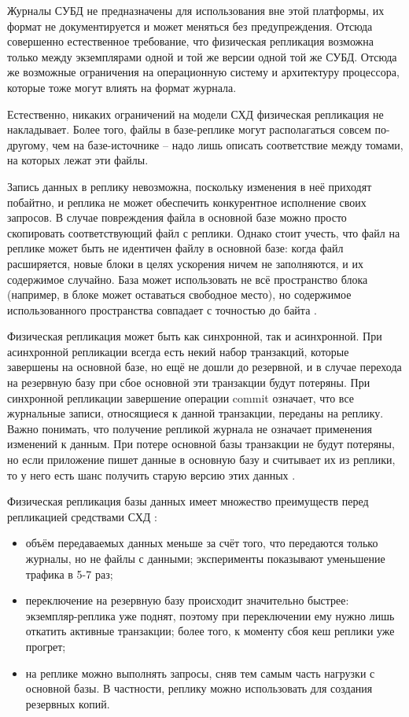 Журналы СУБД не предназначены для использования вне этой платформы, их формат не документируется и может меняться без
предупреждения. Отсюда совершенно естественное требование, что физическая репликация возможна только между экземплярами
одной и той же версии одной той же СУБД. Отсюда же возможные ограничения на операционную систему и архитектуру
процессора, которые тоже могут влиять на формат журнала.

Естественно, никаких ограничений на модели СХД физическая репликация не накладывает. Более того, файлы в базе-реплике
могут располагаться совсем по-другому, чем на базе-источнике – надо лишь описать соответствие между томами, на которых
лежат эти файлы.

Запись данных в реплику невозможна, поскольку изменения в неё приходят побайтно, и реплика не может обеспечить
конкурентное исполнение своих запросов. В случае повреждения файла в основной базе можно просто скопировать
соответствующий файл с реплики. Однако стоит учесть, что файл на реплике может быть не идентичен файлу в основной базе:
когда файл расширяется, новые блоки в целях ускорения ничем не заполняются, и их содержимое случайно. База может
использовать не всё пространство блока (например, в блоке может оставаться свободное место), но содержимое
использованного пространства совпадает с точностью до байта \autocite{PhysLogPeplic}.

Физическая репликация может быть как синхронной, так и асинхронной. При асинхронной репликации всегда есть некий набор
транзакций, которые завершены на основной базе, но ещё не дошли до резервной, и в случае перехода на резервную базу при
сбое основной эти транзакции будут потеряны. При синхронной репликации завершение операции commit означает, что все
журнальные записи, относящиеся к данной транзакции, переданы на реплику. Важно понимать, что получение репликой журнала
не означает применения изменений к данным. При потере основной базы транзакции не будут потеряны, но если приложение
пишет данные в основную базу и считывает их из реплики, то у него есть шанс получить старую версию этих данных \autocite{PhysLogPeplic}.

Физическая репликация базы данных имеет множество преимуществ перед репликацией средствами СХД \autocite{PhysLogPeplic}:
\begin{itemize}
    \item объём передаваемых данных меньше за счёт того, что передаются только журналы, но не файлы с данными; эксперименты показывают уменьшение трафика в 5-7 раз;
    \item переключение на резервную базу происходит значительно быстрее: экземпляр-реплика уже поднят, поэтому при переключении ему нужно лишь откатить активные транзакции; более того, к моменту сбоя кеш реплики уже прогрет;
    \item на реплике можно выполнять запросы, сняв тем самым часть нагрузки с основной базы. В частности, реплику можно использовать для создания резервных копий.
\end{itemize}

